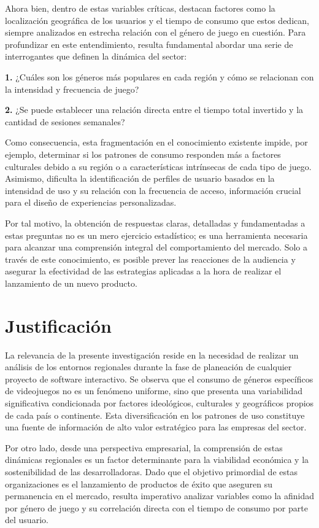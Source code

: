 \documentclass[oneside,11pt]{Latex/Classes/PhDthesisPSnPDF}
\begin{document}
Ahora bien, dentro de estas variables críticas, destacan factores como
la localización geográfica de los usuarios y el tiempo de consumo que
estos dedican, siempre analizados en estrecha relación con el género de
juego en cuestión. Para profundizar en este entendimiento, resulta
fundamental abordar una serie de interrogantes que definen la dinámica
del sector:

\textbf{1.} ¿Cuáles son los géneros más populares en cada región y cómo
se relacionan con la intensidad y frecuencia de juego?~

\textbf{2.} ¿Se puede establecer una relación directa entre el tiempo
total invertido y la cantidad de sesiones semanales?~

Como consecuencia, esta fragmentación en el conocimiento existente
impide, por ejemplo, determinar si los patrones de consumo responden más
a factores culturales debido a su región o a características intrínsecas
de cada tipo de juego. Asimismo, dificulta la identificación de perfiles
de usuario basados en la intensidad de uso y su relación con la
frecuencia de acceso, información crucial para el diseño de experiencias
personalizadas.

Por tal motivo, la obtención de respuestas claras, detalladas y
fundamentadas a estas preguntas no es un mero ejercicio estadístico; es
una herramienta necesaria para alcanzar una comprensión integral del
comportamiento del mercado. Solo a través de este conocimiento, es
posible prever las reacciones de la audiencia y asegurar la efectividad
de las estrategias aplicadas a la hora de realizar el lanzamiento de un
nuevo producto.

\section{Justificación}

La relevancia de la presente investigación reside en la necesidad de
realizar un análisis de los entornos regionales durante la fase de
planeación de cualquier proyecto de software interactivo. Se observa que
el consumo de géneros específicos de videojuegos no es un fenómeno
uniforme, sino que presenta una variabilidad significativa condicionada
por factores ideológicos, culturales y geográficos propios de cada país
o continente. Esta diversificación en los patrones de uso constituye una
fuente de información de alto valor estratégico para las empresas del
sector.

Por otro lado, desde una perspectiva empresarial, la comprensión de
estas dinámicas regionales es un factor determinante para la viabilidad
económica y la sostenibilidad de las desarrolladoras. Dado que el
objetivo primordial de estas organizaciones es el lanzamiento de
productos de éxito que aseguren su permanencia en el mercado, resulta
imperativo analizar variables como la afinidad por género de juego y su
correlación directa con el tiempo de consumo por parte del usuario.
\end{document}
